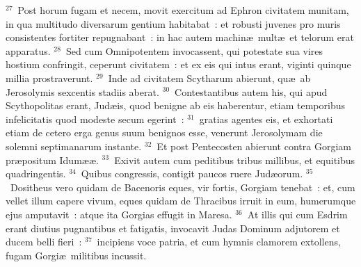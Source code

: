 ${}^{27}$~Post horum fugam et necem, movit exercitum ad Ephron civitatem munitam, in qua multitudo diversarum gentium habitabat~: et robusti juvenes pro muris consistentes fortiter repugnabant~: in hac autem machin\ae\ mult\ae\ et telorum erat apparatus.
${}^{28}$~Sed cum Omnipotentem invocassent, qui potestate sua vires hostium confringit, ceperunt civitatem~: et ex eis qui intus erant, viginti quinque millia prostraverunt.
${}^{29}$~Inde ad civitatem Scytharum abierunt, qu\ae\ ab Jerosolymis sexcentis stadiis aberat.
${}^{30}$~Contestantibus autem his, qui apud Scythopolitas erant, Jud\ae is, quod benigne ab eis haberentur, etiam temporibus infelicitatis quod modeste secum egerint~:
${}^{31}$~gratias agentes eis, et exhortati etiam de cetero erga genus suum benignos esse, venerunt Jerosolymam die solemni septimanarum instante.
${}^{32}$~Et post Pentecosten abierunt contra Gorgiam pr\ae positum Idum\ae \ae .
${}^{33}$~Exivit autem cum peditibus tribus millibus, et equitibus quadringentis.
${}^{34}$~Quibus congressis, contigit paucos ruere Jud\ae orum.
${}^{35}$~Dositheus vero quidam de Bacenoris eques, vir fortis, Gorgiam tenebat~: et, cum vellet illum capere vivum, eques quidam de Thracibus irruit in eum, humerumque ejus amputavit~: atque ita Gorgias effugit in Maresa.
${}^{36}$~At illis qui cum Esdrim erant diutius pugnantibus et fatigatis, invocavit Judas Dominum adjutorem et ducem belli fieri~:
${}^{37}$~incipiens voce patria, et cum hymnis clamorem extollens, fugam Gorgi\ae\ militibus incussit.


